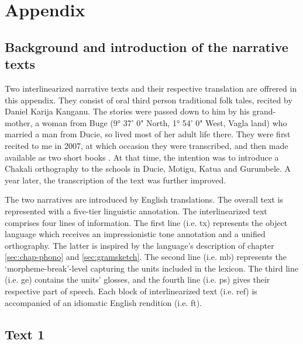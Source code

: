 
\chapter*{Appendix}
\label{chap:TXT-text}
\pagestyle{plain}
%
\section*{Background and introduction of the narrative texts}
\label{chap:TXT-text-2}

Two interlinearized narrative texts and their respective translation are
offrered in this appendix. They consist of oral third person traditional folk
tales, recited by Daniel Karija Kanganu. The stories  were passed down to him by
his grand-mother, a woman from Buge (9° 37' 0" North, 1° 54' 0" West, Vagla
land) who married a man from Ducie, so lived most of her adult life there.
They were first recited to me in 2007, at which occasion they were transcribed, 
and then made available as two short books \citep{Kang07b, Kang07a}.  At that
time, the intention was to introduce a Chakali orthography to the schools in
Ducie, Motigu, Katua and Gurumbele. A year later, the transcription of the text
was further improved. 


The two narratives are introduced by English translations. The overall text is
represented with a  five-tier linguistic annotation.  The interlinearized text
comprises four lines of information. The first line (i.e. tx) represents the
object language which receives an impressionistic tone annotation and a unified
orthography. The latter is inspired by the language's description of chapter
\ref{sec:chap-phono} and \ref{sec:gramsketch}. The second line (i.e. mb)
represents the `morpheme-break'-level capturing the units included in the
lexicon. The third line (i.e. ge) contains  the  units' glosses, and the fourth
line (i.e. ps) gives their respective part of speech. Each block of
interlinearized text (i.e. ref) is accompanied of an idiomatic English
rendition (i.e. ft). 




\cleardoublepage



\section*{Text 1}
\label{chap:TXT-text-1}

